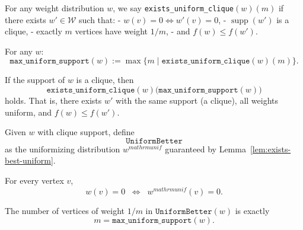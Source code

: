 \begin{definition}\label{def:exists-uniform-clique}
\leanok
{}
For any weight distribution $w$, we say \texttt{exists\_uniform\_clique}$(w)(m)$
if there exists $w' \in \mathcal{W}$ such that:
- $w(v) = 0 \iff w'(v) = 0$,
- $\operatorname{supp}(w')$ is a clique,
- exactly $m$ vertices have weight $1/m$,
- and $f(w) \le f(w')$.
\end{definition}


\begin{definition}\label{def:max-uniform-support}
\leanok
{}
For any $w$:
\[
  \texttt{max\_uniform\_support}(w)
  := \max\{ m \mid \texttt{exists\_uniform\_clique}(w)(m)\}.
\]
\end{definition}


\begin{lemma}\label{lem:exists-best-uniform}
\leanok
{}
If the support of $w$ is a clique, then
\[
  \texttt{exists\_uniform\_clique}(w)\bigl(\texttt{max\_uniform\_support}(w)\bigr)
\]
holds. That is, there exists $w'$ with the same support (a clique), all weights uniform, and $f(w) \le f(w')$.
\end{lemma}

\begin{definition}[UniformBetter]\label{def:uniform-better}
\leanok
{}
Given $w$ with clique support, define
\[
  \texttt{UniformBetter}
\]
as the uniformizing distribution $w^{mathrm{unif}}$ guaranteed by Lemma~\ref{lem:exists-best-uniform}.
\end{definition}


\begin{lemma}\label{lem:uniformbetter-support-zero}
\leanok
{}
For every vertex $v$,
\[
  w(v) = 0 \;\;\Longleftrightarrow\;\; w^{mathrm{unif}}(v) = 0.
\]
\end{lemma}

\begin{lemma}\label{lem:uniformbetter-support-size}
\leanok
{}
The number of vertices of weight $1/m$ in $\texttt{UniformBetter}(w)$ is exactly
\[
  m = \texttt{max\_uniform\_support}(w).
\]
\end{lemma}

